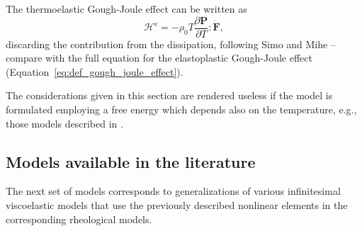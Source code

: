 The thermoelastic Gough-Joule effect can be written as
\begin{equation}
	\mathcal H^\text{e} = -\rho_0T\frac{\partial \bm P}{\partial T}:\dot{\bm F},
\end{equation}
discarding the contribution from the dissipation, following Simo and Mihe \citep{simoAssociativeCoupledThermoplasticity1992} -- compare with the full equation for the elastoplastic Gough-Joule effect (Equation~\eqref{eq:def_gough_joule_effect}).

The considerations given in this section are rendered useless if the model is formulated employing a free energy which depends also on the temperature, e.g., those models described in  \cite{anandThermomechanicallyCoupledTheory2009, amesThermomechanicallyCoupledTheory2009}.

\subsection{Models available in the literature}
\label{sec:rheo_models}


The next set of models corresponds to generalizations of various infinitesimal viscoelastic models that use the previously described nonlinear elements in the corresponding rheological models.

